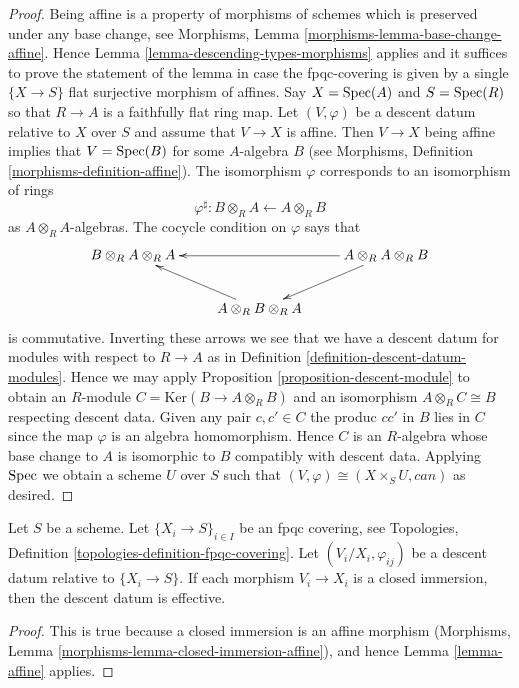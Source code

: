 \begin{proof}
Being affine is a property of morphisms of schemes
which is preserved under any base change, see
Morphisms, Lemma \ref{morphisms-lemma-base-change-affine}.
Hence Lemma \ref{lemma-descending-types-morphisms} applies
and it suffices to prove the statement of the lemma
in case the fpqc-covering is given by a single
$\{X \to S\}$ flat surjective morphism of affines.
Say $X = \mathop{\rm Spec}(A)$ and $S = \mathop{\rm Spec}(R)$ so
that $R \to A$ is a faithfully flat ring map.
Let $(V, \varphi)$ be a descent datum relative to $X$ over $S$
and assume that $V \to X$ is affine.
Then $V \to X$ being affine implies that $V = \mathop{\rm Spec}(B)$
for some $A$-algebra $B$ (see
Morphisms, Definition \ref{morphisms-definition-affine}).
The isomorphism $\varphi$ corresponds to an isomorphism
of rings
$$
\varphi^\sharp :
B \otimes_R A \longleftarrow A \otimes_R B
$$
as $A \otimes_R A$-algebras. The cocycle condition on $\varphi$
says that
$$
\xymatrix{
B \otimes_R A \otimes_R A & &
A \otimes_R A \otimes_R B \ar[ll] \ar[ld]\\
& A \otimes_R B \otimes_R A \ar[lu] &
}
$$
is commutative. Inverting these arrows we see that we have a
descent datum for modules with respect to $R \to A$ as in
Definition \ref{definition-descent-datum-modules}.
Hence we may apply Proposition \ref{proposition-descent-module}
to obtain an $R$-module
$C = \text{Ker}(B \to A \otimes_R B)$
and an isomorphism $A \otimes_R C \cong B$
respecting descent data. Given any pair $c, c' \in C$
the produc $cc'$ in $B$ lies in $C$ since the
map $\varphi$ is an algebra homomorphism. Hence
$C$ is an $R$-algebra whose base change to $A$ is
isomorphic to $B$ compatibly with descent data.
Applying $\mathop{\rm Spec}$ we obtain a scheme
$U$ over $S$ such that $(V, \varphi) \cong (X \times_S U, can)$
as desired.
\end{proof}

\begin{lemma}
\label{lemma-closed-immersion}
Let $S$ be a scheme.
Let $\{X_i \to S\}_{i\in I}$ be an fpqc covering, see
Topologies, Definition \ref{topologies-definition-fpqc-covering}.
Let $(V_i/X_i, \varphi_{ij})$ be a descent datum
relative to $\{X_i \to S\}$. If each morphism
$V_i \to X_i$ is a closed immersion, then the descent datum is
effective.
\end{lemma}

\begin{proof}
This is true because a closed immersion is an affine morphism
(Morphisms, Lemma \ref{morphisms-lemma-closed-immersion-affine}),
and hence Lemma \ref{lemma-affine} applies.
\end{proof}


